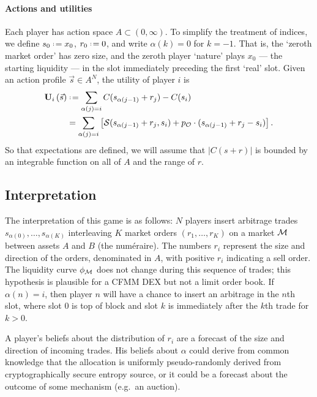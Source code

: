 \paragraph{Actions and utilities} Each player has action space $A\subset (0,\infty)$.
%
To simplify the treatment of indices, we define $s_0\defeq x_0$, $r_0\defeq 0$, and write $\alpha(k)=0$ for $k=-1$.
%
That is, the `zeroth market order' has zero size, and the zeroth player `nature' plays $x_0$ --- the starting liquidity --- in the slot immediately preceding the first `real' slot.
%
Given an action profile $\vec{s}\in A^N$, the utility of player $i$ is
\begin{align} \label{utility}
  \Utility_i\left(\vec{s}\right) &\defeq \sum_{\alpha(j)=i} C(s_{\alpha(j-1)} + r_j) - C(s_i) \\
  &= \sum_{\alpha(j)=i}\left[\action(s_{\alpha(j-1)} + r_j, s_i) + p_\oracle\cdot (s_{\alpha(j-1)} + r_j - s_i)\right].
\end{align}
%
So that expectations are defined, we will assume that $|C(s+r)|$ is bounded by an integrable function on all of $A$ and the range of $r$.





\subsection{Interpretation} \label{interpretation}

The interpretation of this game is as follows: $N$ players insert arbitrage trades \(s_{\alpha(0)},\ldots,s_{\alpha(K)}\) interleaving \(K\) market orders $(r_1,\ldots,r_K)$ on a market \(\mathcal{M}\) between assets \(A\) and \(B\) (the numéraire). 
%
The numbers $r_i$ represent the size and direction of the orders, denominated in \(A\), with positive $r_i$ indicating a sell order.
%
The liquidity curve $\phi_{\mathcal{M}}$ does not change during this sequence of trades; this hypothesis is plausible for a CFMM DEX but not a limit order book.
%
If $\alpha(n)=i$, then player $n$ will have a chance to insert an arbitrage in the $n$th slot, where slot $0$ is top of block and slot $k$ is immediately after the $k$th trade for $k>0$.

A player's beliefs about the distribution of $r_i$ are a forecast of the size and direction of incoming trades.
%
His beliefs about $\alpha$ could derive from common knowledge that the allocation is uniformly pseudo-randomly derived from cryptographically secure entropy source, or it could be a forecast about the outcome of some mechanism (e.g.~an auction).

